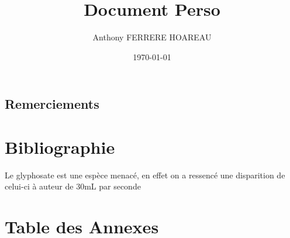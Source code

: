 \documentclass[a4paper,11pt,twoside]{article} %
\title{Document Perso}
\author{Anthony FERRERE HOAREAU}
\date{\today}
\begin{document}

\maketitle
\clearpage


\dosecttoc{} %

\thispagestyle{empty} %
\subsection*{Remerciements}

\clearpage


\thispagestyle{empty} %
\setcounter{secnumdepth}{1}
\tableofcontents %
\clearpage


\setcounter{page}{1}


\section{Bibliographie}
Le glyphosate est une espèce menacé\cite{Glyphosate_2024_def}, en effet on a ressencé une disparition de celui-ci à auteur de 30mL par seconde
\printbibliography %


\clearpage
\appendix
\section{Table des Annexes}
\renewcommand{\stctitle}{}                          %
\renewcommand\thesubsection{A\arabic{subsection}}   %
\renewcommand{\stcSSfont}{}                         %
\secttoc
\end{document}
